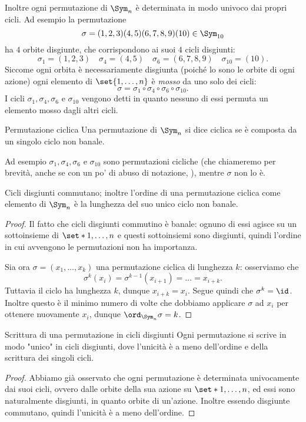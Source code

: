 Inoltre ogni permutazione di $\Sym_n$ è determinata in modo univoco dai propri cicli. Ad esempio la permutazione \[
    \sigma = (1, 2, 3)(4, 5)(6, 7, 8, 9)(10) \in \Sym_{10}
\] ha $4$ orbite disgiunte, che corrispondono ai suoi $4$ cicli disgiunti: \[
    \sigma_{1} = (1, 2, 3) \quad \sigma_{4} = (4, 5) \quad \sigma_{6} = (6, 7, 8, 9) \quad \sigma_{10} = (10).
\] Siccome ogni orbita è necessariamente disgiunta (poiché lo sono le orbite di ogni azione) ogni elemento di $\set{1, \dots, n}$ è \emph{mosso} da uno solo dei cicli: \[
    \sigma = \sigma_1 \circ \sigma_4 \circ \sigma_6 \circ \sigma_{10}.
\] I cicli $\sigma_1, \sigma_4, \sigma_6$ e $\sigma_{10}$ vengono detti  in quanto nessuno di essi permuta un elemento mosso dagli altri cicli.

\begin{definition}
    {Permutazione ciclica}{}
    Una permutazione di $\Sym_n$ si dice ciclica se è composta da un singolo ciclo non banale.
\end{definition}

Ad esempio $\sigma_1, \sigma_4, \sigma_6$ e $\sigma_{10}$ sono permutazioni cicliche (che chiameremo per brevità, anche se con un po' di abuso di notazione, ), mentre $\sigma$ non lo è.

\begin{remark}
    Cicli disgiunti commutano; inoltre l'ordine di una permutazione ciclica come elemento di $\Sym_n$ è la lunghezza del suo unico ciclo non banale.
    \begin{proof}
        Il fatto che cicli disgiunti commutino è banale: ognuno di essi agisce su un sottoinsieme di $\set*{1, \dots, n}$ e questi sottoinsiemi sono disgiunti, quindi l'ordine in cui avvengono le permutazioni non ha importanza.

        Sia ora $\sigma = (x_1, \dots, x_k)$ una permutazione ciclica di lunghezza $k$: osserviamo che \[
            \sigma^k(x_i) = \sigma^{k-1}(x_{i+1}) = \dots = x_{i+k}.
        \] Tuttavia il ciclo ha lunghezza $k$, dunque $x_{i+k} = x_i$. Segue quindi che $\sigma^k = \id$. Inoltre questo è il minimo numero di volte che dobbiamo applicare $\sigma$ ad $x_i$ per ottenere nuovamente $x_i$, dunque $\ord_{\Sym_n}{\sigma} = k$.
    \end{proof}
\end{remark}

\begin{proposition}
    {Scrittura di una permutazione in cicli disgiunti}{}
    Ogni permutazione si scrive in modo "unico" in cicli disgiunti, dove l'unicità è a meno dell'ordine e della scrittura dei singoli cicli.
\end{proposition}
\begin{proof}
    Abbiamo già osservato che ogni permutazione è determinata univocamente dai suoi cicli, ovvero dalle orbite della sua azione su $\set*{1, \dots, n}$, ed essi sono naturalmente disgiunti, in quanto orbite di un'azione. Inoltre essendo disgiunte commutano, quindi l'unicità è a meno dell'ordine.
\end{proof}

